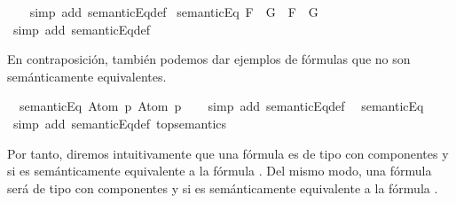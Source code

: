 \begin{isabellebody}
%
\isadelimproof
\ \ %
\endisadelimproof
%
\isatagproof
{}\isamarkupfalse%
\ {\isacharparenleft}simp\ add{\isacharcolon}\ semanticEq{\isacharunderscore}def{\isacharparenright}%
\endisatagproof
{\isafoldproof}%
%
\isadelimproof
\isanewline
%
\endisadelimproof
\isanewline
{}\isamarkupfalse%
\ {\isachardoublequoteopen}semanticEq\ {\isacharparenleft}F\ \isactrlbold {\isasymrightarrow}\ G{\isacharparenright}\ {\isacharparenleft}\isactrlbold {\isasymnot}\ F\ \isactrlbold {\isasymor}\ G{\isacharparenright}{\isachardoublequoteclose}\isanewline
%
\isadelimproof
\ \ %
\endisadelimproof
%
\isatagproof
{}\isamarkupfalse%
\ {\isacharparenleft}simp\ add{\isacharcolon}\ semanticEq{\isacharunderscore}def{\isacharparenright}%
\endisatagproof
{\isafoldproof}%
%
\isadelimproof
%
\endisadelimproof
%
\begin{isamarkuptext}%
En contraposición, también podemos dar ejemplos de fórmulas que no son semánticamente 
  equivalentes.%
\end{isamarkuptext}\isamarkuptrue%
\isamarkupfalse%
\ {\isachardoublequoteopen}{\isasymnot}\ semanticEq\ {\isacharparenleft}Atom\ p{\isacharparenright}\ {\isacharparenleft}\isactrlbold {\isasymnot}{\isacharparenleft}Atom\ p{\isacharparenright}{\isacharparenright}{\isachardoublequoteclose}\isanewline
%
\isadelimproof
\ \ %
\endisadelimproof
%
\isatagproof
{}\isamarkupfalse%
\ {\isacharparenleft}simp\ add{\isacharcolon}\ semanticEq{\isacharunderscore}def{\isacharparenright}%
\endisatagproof
{\isafoldproof}%
%
\isadelimproof
\isanewline
%
\endisadelimproof
\isanewline
{}\isamarkupfalse%
\ {\isachardoublequoteopen}{\isasymnot}\ semanticEq\ {\isasymbottom}\ {\isasymtop}{\isachardoublequoteclose}\isanewline
%
\isadelimproof
\ \ %
\endisadelimproof
%
\isatagproof
{}\isamarkupfalse%
\ {\isacharparenleft}simp\ add{\isacharcolon}\ semanticEq{\isacharunderscore}def\ top{\isacharunderscore}semantics{\isacharparenright}%
\endisatagproof
{\isafoldproof}%
%
\isadelimproof
%
\endisadelimproof
%
\begin{isamarkuptext}%
Por tanto, diremos intuitivamente que una fórmula es de tipo \isa{{\isasymalpha}} con componentes  y 
  si es semánticamente equivalente a la fórmula . Del mismo modo, una fórmula será de tipo
  \isa{{\isasymbeta}} con componentes  y  si es semánticamente equivalente a la fórmula .


\end{isamarkuptext}
\end{isabellebody}
